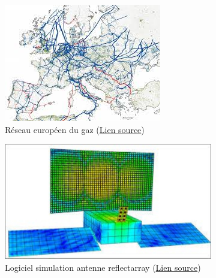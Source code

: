 \documentclass[12pt, french]{article}
\begin{document}
\begin{figure}[t]
	\begin{subfigure}[t]{0.3\textwidth}
		\includegraphics[width=\columnwidth]{EU_gas_network.jpeg}%
		\caption{Réseau européen du gaz (\href{https://vividmaps.com/the-european-natural-gas-network/}{Lien source})}
		\label{fig:network}
	\end{subfigure}\hfill
	\begin{subfigure}[t]{0.35\textwidth}
		\includegraphics[width=\columnwidth]{Reflectarray.jpg} 
		\caption{Logiciel simulation antenne reflectarray (\href{https://www.esa.int/Enabling_Support/Space_Engineering_Technology/Smart_design_of_flat_reflectarray_satellite_antennas}{Lien source})}
		\label{fig:array}
	\end{subfigure}\hfill
	\begin{subfigure}[t]{0.25\textwidth}

\end{subfigure}
\end{figure}
\end{document}
